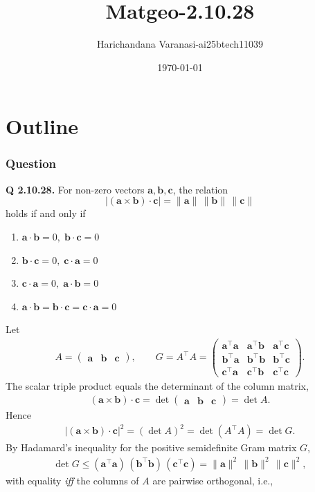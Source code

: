 \documentclass{beamer}
\title{Matgeo-2.10.28}
\author{Harichandana Varanasi-ai25btech11039}
\date{\today}
\theoremstyle{remark}
\providecommand{\abs}[1]{\left\vert#1\right\vert}
\newcommand{\myvec}[1]{\ensuremath{\begin{pmatrix}#1\end{pmatrix}}}
\let\vec\mathbf
\begin{document}
\begin{frame}
\titlepage
\end{frame}

\section*{Outline}

\begin{frame}
\frametitle{Question}
\textbf{Q 2.10.28.}
For non-zero vectors $\vec a,\vec b,\vec c$, the relation
\[
\bigl|(\vec a\times \vec b)\cdot \vec c\bigr|=\|\vec a\|\,\|\vec b\|\,\|\vec c\|
\]
holds if and only if
\begin{enumerate}
  \item $\vec a\cdot\vec b=0,\; \vec b\cdot\vec c=0$
  \item $\vec b\cdot\vec c=0,\; \vec c\cdot\vec a=0$
  \item $\vec c\cdot\vec a=0,\; \vec a\cdot\vec b=0$
  \item $\vec a\cdot\vec b=\vec b\cdot\vec c=\vec c\cdot\vec a=0$
\end{enumerate}


\end{frame}
%
\begin{frame}

\begin{solution}
Let 
\begin{align}
A=\myvec{\vec{a}&\vec{b}&\vec{c}}, \qquad 
G=A^\top A
=\myvec{
\vec{a}^\top\vec{a} & \vec{a}^\top\vec{b} & \vec{a}^\top\vec{c}\\
\vec{b}^\top\vec{a} & \vec{b}^\top\vec{b} & \vec{b}^\top\vec{c}\\
\vec{c}^\top\vec{a} & \vec{c}^\top\vec{b} & \vec{c}^\top\vec{c} } .
\label{eq:gram}
\end{align}
The scalar triple product equals the determinant of the column matrix,
\begin{align}
(\vec{a}\times\vec{b})\cdot\vec{c}
=\det\myvec{\vec{a}&\vec{b}&\vec{c}}=\det A .
\label{eq:triple-is-det}
\end{align}
Hence
\begin{align}
\abs{(\vec{a}\times\vec{b})\cdot\vec{c}}^{2}
=(\det A)^2
= \det(A^\top A)=\det G .
\label{eq:detG}
\end{align}
By Hadamard’s inequality for the positive semidefinite Gram matrix $G$,
\begin{align}
\det G \le (\vec{a}^\top\vec{a})\,(\vec{b}^\top\vec{b})\,(\vec{c}^\top\vec{c})
= \|\vec{a}\|^2\,\|\vec{b}\|^2\,\|\vec{c}\|^2,
\label{eq:hadamard}
\end{align}
with equality \emph{iff} the columns of $A$ are pairwise orthogonal, i.e.,
\end{solution}
\end{frame}
\end{document}
